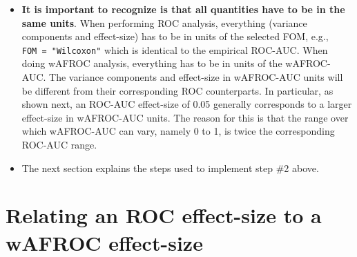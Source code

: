 \documentclass[]{book}
\begin{document}
\begin{itemize}
\item
  \textbf{It is important to recognize is that all quantities have to be in the same units}. When performing ROC analysis, everything (variance components and effect-size) has to be in units of the selected FOM, e.g., \texttt{FOM\ =\ "Wilcoxon"} which is identical to the empirical ROC-AUC. When doing wAFROC analysis, everything has to be in units of the wAFROC-AUC. The variance components and effect-size in wAFROC-AUC units will be different from their corresponding ROC counterparts. In particular, as shown next, an ROC-AUC effect-size of 0.05 generally corresponds to a larger effect-size in wAFROC-AUC units. The reason for this is that the range over which wAFROC-AUC can vary, namely 0 to 1, is twice the corresponding ROC-AUC range.
\item
  The next section explains the steps used to implement step \#2 above.
\end{itemize}

\hypertarget{relating-an-roc-effect-size-to-a-wafroc-effect-size}{%
\section{Relating an ROC effect-size to a wAFROC effect-size}\label{relating-an-roc-effect-size-to-a-wafroc-effect-size}}
\end{document}

